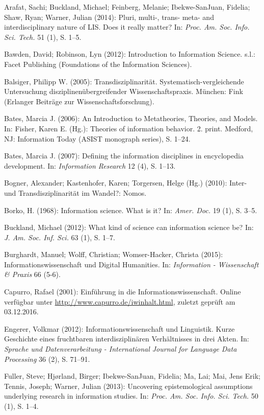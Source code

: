 \documentclass[a4paper,
fontsize=11pt,
oneside,
numbers=noperiodatend,
parskip=half-,
bibliography=totoc,
final
]{scrartcl}
\begin{document}
Arafat, Sachi; Buckland, Michael; Feinberg, Melanie; Ibekwe-SanJuan,
Fidelia; Shaw, Ryan; Warner, Julian (2014): Pluri, multi-, trans- meta-
and interdisciplinary nature of LIS. Does it really matter? In:
\emph{Proc. Am. Soc. Info. Sci. Tech.} 51 (1), S. 1--5.

Bawden, David; Robinson, Lyn (2012): Introduction to Information
Science. s.l.: Facet Publishing (Foundations of the Information
Sciences).

Balsiger, Philipp W. (2005): Transdisziplinarität.
Systematisch-vergleichende Untersuchung disziplinenübergreifender
Wissenschaftspraxis. München: Fink (Erlanger Beiträge zur
Wissenschaftsforschung).

Bates, Marcia J. (2006): An Introduction to Metatheories, Theories, and
Models. In: Fisher, Karen E. (Hg.): Theories of information behavior. 2.
print. Medford, NJ: Information Today (ASIST monograph series), S.
1--24.

Bates, Marcia J. (2007): Defining the information disciplines in
encyclopedia development. In: \emph{Information Research} 12 (4), S.
1--13.

Bogner, Alexander; Kastenhofer, Karen; Torgersen, Helge (Hg.) (2010):
Inter- und Transdisziplinarität im Wandel?: Nomos.

Borko, H. (1968): Information science. What is it? In: \emph{Amer. Doc.}
19 (1), S. 3--5.

Buckland, Michael (2012): What kind of science can information science
be? In: \emph{J. Am. Soc. Inf. Sci.} 63 (1), S. 1--7.

Burghardt, Manuel; Wolff, Christian; Womser-Hacker, Christa (2015):
Informationswissenschaft und Digital Humanities. In: \emph{Information -
Wissenschaft \& Praxis} 66 (5-6).

Capurro, Rafael (2001): Einführung in die Informationswissenschaft.
Online verfügbar unter \url{http://www.capurro.de/iwinhalt.html},
zuletzt geprüft am 03.12.2016.

Engerer, Volkmar (2012): Informationswissenschaft und Linguistik. Kurze
Geschichte eines fruchtbaren interdisziplinären Verhältnisses in drei
Akten. In: \emph{Sprache und Datenverarbeitung - International Journal
for Language Data Processing} 36 (2), S. 71--91.

Fuller, Steve; Hjørland, Birger; Ibekwe-SanJuan, Fidelia; Ma, Lai; Mai,
Jens Erik; Tennis, Joseph; Warner, Julian (2013): Uncovering
epistemological assumptions underlying research in information studies.
In: \emph{Proc. Am. Soc. Info. Sci. Tech.} 50 (1), S. 1--4.
\end{document}
